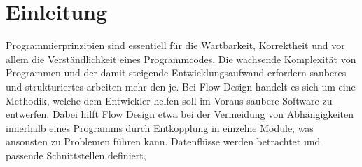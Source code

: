 
\section{Einleitung}

Programmierprinzipien sind essentiell für die Wartbarkeit, Korrektheit und vor allem die Verständlichkeit eines Programmcodes. Die wachsende Komplexität von Programmen und der damit steigende Entwicklungsaufwand erfordern sauberes und strukturiertes arbeiten mehr den je. 
Bei Flow Design handelt es sich um eine Methodik, welche dem Entwickler helfen soll im Voraus saubere Software zu entwerfen. Dabei hilft Flow Design etwa bei der Vermeidung von Abhängigkeiten innerhalb eines Programms durch Entkopplung in einzelne Module, was ansonsten zu Problemen führen kann.
Datenflüsse werden betrachtet und passende Schnittstellen definiert, 